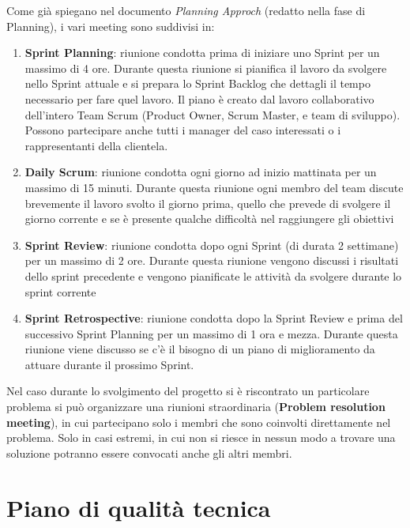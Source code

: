 \documentclass{article}
\begin{document}
Come già spiegano nel documento \textit{Planning Approch} (redatto nella fase di Planning), i vari meeting sono suddivisi in:
\begin{enumerate}
    \item \textbf{Sprint Planning}: riunione condotta prima di iniziare uno Sprint per un massimo di 4 ore.
    Durante questa riunione si pianifica il lavoro da svolgere nello Sprint attuale e si 
    prepara lo Sprint Backlog che dettagli il tempo necessario per fare quel lavoro. 
    Il piano è creato dal lavoro collaborativo dell'intero Team Scrum (Product Owner, Scrum Master, e team di sviluppo).
    Possono partecipare anche tutti i manager del caso interessati o i rappresentanti della clientela.

    \item \textbf{Daily Scrum}: riunione condotta ogni giorno ad inizio mattinata per un massimo di 15 minuti. 
    Durante questa riunione ogni membro del team discute brevemente il lavoro svolto il giorno prima, 
    quello che prevede di svolgere il giorno corrente e se è presente qualche difficoltà nel raggiungere 
    gli obiettivi
    
    \item \textbf{Sprint Review}: riunione condotta dopo ogni Sprint (di durata 2 settimane) per un massimo di 2 ore.
    Durante questa riunione vengono discussi i risultati dello sprint precedente e vengono pianificate le attività da 
    svolgere durante lo sprint corrente
    
    \item \textbf{Sprint Retrospective}: riunione condotta dopo la Sprint Review e prima del successivo Sprint Planning 
    per un massimo di 1 ora e mezza. 
    Durante questa riunione viene discusso se c'è il bisogno di un piano di miglioramento da attuare durante il prossimo Sprint.
\end{enumerate}

Nel caso durante lo svolgimento del progetto si è riscontrato un particolare problema si può organizzare una riunioni straordinaria
(\textbf{Problem resolution meeting}), in cui partecipano solo i membri che sono coinvolti direttamente nel problema. 
Solo in casi estremi, in cui non si riesce in nessun modo a trovare una soluzione potranno essere convocati anche gli altri membri.

\section{Piano di qualità tecnica}
\end{document}
